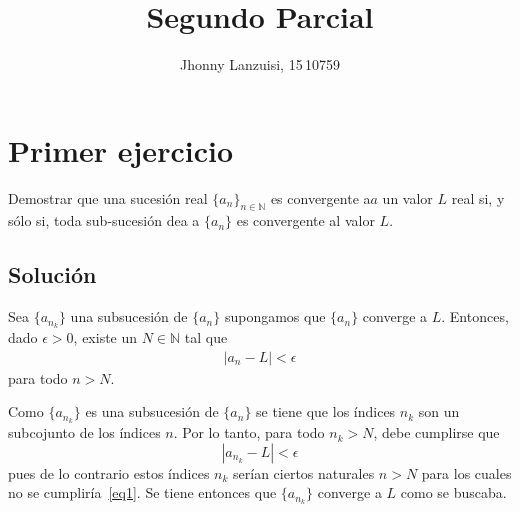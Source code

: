 \documentclass[fleqn,leqno,11pt,letterpaper,final]{article}
\title{Segundo Parcial}
\author{Jhonny Lanzuisi, 15\,10759}
\begin{document}
\maketitle
\tableofcontents
\section{Primer ejercicio}
Demostrar que una sucesión real $\{ a_n \}_{n\in\mathbb{N}}$ es convergente a$a$ un valor $L$ real si, y
sólo si, toda sub-sucesión de\textsf{a} a $\{ a_n \}$ es convergente al valor $L$.

\subsection{Solución}

Sea $\{ a_{n_k} \}$ una subsucesión de $\{ a_n \}$ 
supongamos que $\{ a_n \}$ converge a $L$. Entonces, dado $\epsilon>0$, existe un $N\in\mathbb{N}$ tal que
\begin{align}\label{eq1}
	\left\lvert  a_n - L \right\rvert<\epsilon
\end{align}
para todo $n>N$.

Como $\{ a_{n_k} \}$ es una subsucesión de $\{ a_n \}$ se tiene que los índices $n_{k}$ son
un subcojunto de los índices $n$. Por lo tanto, para todo $n_{k}>N$, debe cumplirse que
\[
	\left\lvert a_{n_k}-L \right\rvert<\epsilon
\]
pues de lo contrario estos índices $n_k$ serían ciertos naturales $n>N$ para los cuales
no se cumpliría~\ref{eq1}. Se tiene entonces que $\{ a_{n_k} \}$ converge a $L$ como se
buscaba.
\end{document}

